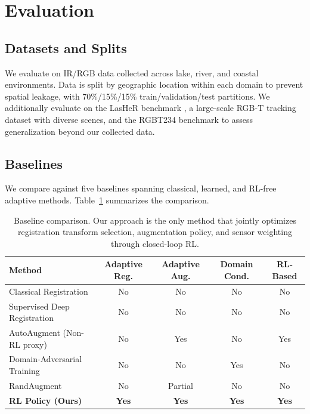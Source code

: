 \documentclass[12pt]{article}
\begin{document}
\section{Evaluation}

\subsection{Datasets and Splits}

We evaluate on IR/RGB data collected across lake, river, and coastal environments. Data is split by geographic location within each domain to prevent spatial leakage, with 70\%/15\%/15\% train/validation/test partitions. We additionally evaluate on the LasHeR benchmark \citep{Li2022RGBTTracking}, a large-scale RGB-T tracking dataset with diverse scenes, and the RGBT234 benchmark \citep{Li2023IRRegistration} to assess generalization beyond our collected data.

\subsection{Baselines}

We compare against five baselines spanning classical, learned, and RL-free adaptive methods. Table~\ref{tab:baselines} summarizes the comparison.

\begin{table}[H]
    \centering
    \caption{Baseline comparison. Our approach is the only method that jointly optimizes registration transform selection, augmentation policy, and sensor weighting through closed-loop RL.}
    \label{tab:baselines}
    \begin{tabular}{@{}lcccc@{}}
        \toprule
        \textbf{Method} & \textbf{Adaptive Reg.} & \textbf{Adaptive Aug.} & \textbf{Domain Cond.} & \textbf{RL-Based} \\
        \midrule
        Classical Registration & No & No & No & No \\
        Supervised Deep Registration & No & No & No & No \\
        AutoAugment (Non-RL proxy) & No & Yes & No & Yes \\
        Domain-Adversarial Training & No & No & Yes & No \\
        RandAugment & No & Partial & No & No \\
        \textbf{RL Policy (Ours)} & \textbf{Yes} & \textbf{Yes} & \textbf{Yes} & \textbf{Yes} \\
        \bottomrule
    \end{tabular}
\end{table}
\end{document}
